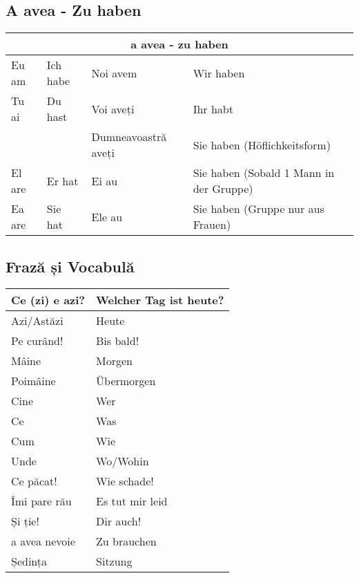 \documentclass[11pt, oneside]{article}
\begin{document}
\subsection{A avea - Zu haben}
\begin{center}
  \begin{tabular}{ |p{2cm}|p{2cm}||l|l|  }
      \hline
      \multicolumn{4}{|c|}{a avea - zu haben} \\
      \hline
      \hline
      Eu am & Ich habe & Noi avem & Wir haben\\
      \hline
      Tu ai & Du hast & Voi aveți & Ihr habt\\
      & & Dumneavoastră aveți & Sie haben (Höflichkeitsform)\\
      \hline
      El are & Er hat & Ei au & Sie haben (Sobald 1 Mann in der Gruppe)\\ 
      Ea are & Sie hat & Ele au & Sie haben (Gruppe nur aus Frauen)\\
      \hline
     \end{tabular}
\end{center}
%
\subsection{Frază și Vocabulă}
\begin{center}
  \begin{tabular}{ | p{6cm}| p{6cm} | } 
    \hline
    Ce (zi) e azi? & Welcher Tag ist heute?\\
    \hline
    Azi/Astăzi &  Heute\\
    \hline
    Pe curând! & Bis bald!\\
    \hline
    Mâine & Morgen\\
    \hline
    Poimâine & Übermorgen\\
    \hline
    Cine & Wer \\
    \hline
    Ce & Was \\
    \hline
    Cum & Wie \\
    \hline
    Unde & Wo/Wohin\\
    \hline
    Ce păcat! & Wie schade!\\
    \hline
    Îmi pare rău & Es tut mir leid\\
    \hline
    Și ție! & Dir auch!\\
    \hline
    a avea nevoie & Zu brauchen\\
    \hline
    Ședința & Sitzung \\
    \hline
  \end{tabular}
\end{center}
%
\pagebreak
\end{document}
